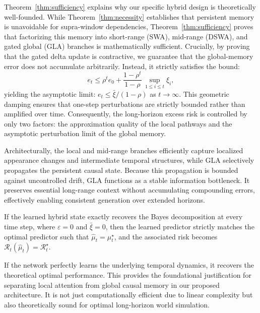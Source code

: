 \documentclass{llmxive}
\begin{document}
\begin{remark}
\normalfont Theorem~\ref{thm:sufficiency} explains why our specific hybrid design is theoretically well-founded. While Theorem~\ref{thm:necessity} establishes that persistent memory is unavoidable for supra-window dependencies, Theorem~\ref{thm:sufficiency} proves that factorizing this memory into short-range (\textsc{SWA}), mid-range (\textsc{DSWA}), and gated global (\textsc{GLA}) branches is mathematically sufficient. Crucially, by proving that the gated delta update is contractive, we guarantee that the global-memory error does not accumulate arbitrarily. Instead, it strictly satisfies the bound:
\[
e_t \le \rho^t e_0 + \frac{1-\rho^t}{1-\rho}\, \sup_{1\le i\le t}\xi_i,
\]
yielding the asymptotic limit: $e_t \le \bar\xi/(1-\rho)$ as  $t\to\infty.$ This geometric damping ensures that one-step perturbations are strictly bounded rather than amplified over time. Consequently, the long-horizon excess risk is controlled by only two factors: the approximation quality of the local pathways and the asymptotic perturbation limit of the global memory.

Architecturally, the local and mid-range branches efficiently capture localized appearance changes and intermediate temporal structures, while \textsc{GLA} selectively propagates the persistent causal state. Because this propagation is bounded against uncontrolled drift, \textsc{GLA} functions as a stable information bottleneck. It preserves essential long-range context without accumulating compounding errors, effectively enabling consistent generation over extended horizons.
\end{remark}

\begin{corollary}
\label{cor:exact_sufficiency}
If the learned hybrid state exactly recovers the Bayes decomposition at every time step, where $\varepsilon=0$ and $\bar{\xi}=0$, then the learned predictor strictly matches the optimal predictor such that $\hat{\mu}_t = \mu_t^\star$, and the associated risk becomes $\mathcal{R}_t(\hat{\mu}_t) = \mathcal{R}_t^\star$.
\end{corollary}

\begin{remark}
\normalfont If the network perfectly learns the underlying temporal dynamics, it recovers the theoretical optimal performance. This provides the foundational justification for separating local attention from global causal memory in our proposed architecture. It is not just computationally efficient due to linear complexity but also theoretically sound for optimal long-horizon world simulation.
\end{remark}
\end{document}
